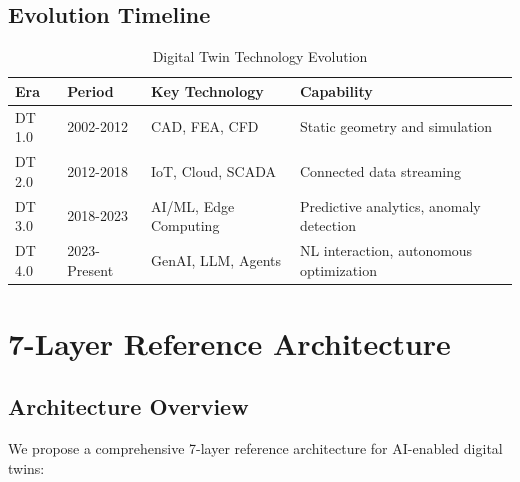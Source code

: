 \documentclass[12pt,a4paper]{article}
\begin{document}
\subsection{Evolution Timeline}

\begin{table}[H]
\centering
\caption{Digital Twin Technology Evolution}
\begin{tabular}{lllp{4.5cm}}
\toprule
\textbf{Era} & \textbf{Period} & \textbf{Key Technology} & \textbf{Capability} \\
\midrule
DT 1.0 & 2002-2012 & CAD, FEA, CFD & Static geometry and simulation \\
DT 2.0 & 2012-2018 & IoT, Cloud, SCADA & Connected data streaming \\
DT 3.0 & 2018-2023 & AI/ML, Edge Computing & Predictive analytics, anomaly detection \\
DT 4.0 & 2023-Present & GenAI, LLM, Agents & NL interaction, autonomous optimization \\
\bottomrule
\end{tabular}
\end{table}

\section{7-Layer Reference Architecture}

\subsection{Architecture Overview}

We propose a comprehensive 7-layer reference architecture for AI-enabled digital twins:
\end{document}
